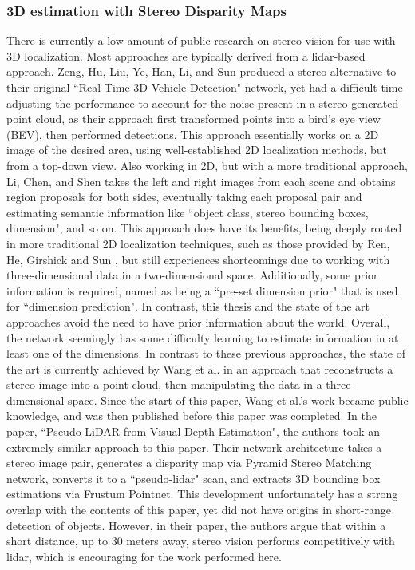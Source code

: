 \subsubsection{3D estimation with Stereo Disparity Maps}
There is currently a low amount of public research on stereo vision for use with 3D localization. Most approaches are typically derived from a lidar-based approach. Zeng, Hu, Liu, Ye, Han, Li, and Sun \cite{zeng2018rt3d} produced a stereo alternative to their original ``Real-Time 3D Vehicle Detection" network, yet had a difficult time adjusting the performance to account for the noise present in a stereo-generated point cloud, as their approach first transformed points into a bird's eye view (BEV), then performed detections. This approach essentially works on a 2D image of the desired area, using well-established 2D localization methods, but from a top-down view. Also working in 2D, but with a more traditional approach, Li, Chen, and Shen \cite{li_stereo_2019} takes the left and right images from each scene and obtains region proposals for both sides, eventually taking each proposal pair and estimating semantic information like ``object class, stereo bounding boxes, dimension", and so on. This approach does have its benefits, being deeply rooted in more traditional 2D localization techniques, such as those provided by Ren, He, Girshick and Sun \cite{ren_faster_2015}, but still experiences shortcomings due to working with three-dimensional data in a two-dimensional space. Additionally, some prior information is required, named as being a ``pre-set dimension prior" that is used for ``dimension prediction". In contrast, this thesis and the state of the art approaches avoid the need to have prior information about the world. Overall, the network seemingly has some difficulty learning to estimate information in at least one of the dimensions. In contrast to these previous approaches, the state of the art is currently achieved by Wang et al. \cite{wang_pseudo-lidar_2019} in an approach that reconstructs a stereo image into a point cloud, then manipulating the data in a three-dimensional space. Since the start of this paper, Wang et al.'s work became public knowledge, and was then published before this paper was completed. In the paper, ``Pseudo-LiDAR from Visual Depth Estimation", the authors took an extremely similar approach to this paper. Their network architecture takes a stereo image pair, generates a disparity map via Pyramid Stereo Matching network, converts it to a ``pseudo-lidar" scan, and extracts 3D bounding box estimations via Frustum Pointnet. This development unfortunately has a strong overlap with the contents of this paper, yet did not have origins in short-range detection of objects. However, in their paper, the authors argue that within a short distance, up to 30 meters away, stereo vision performs competitively with lidar, which is encouraging for the work performed here.

